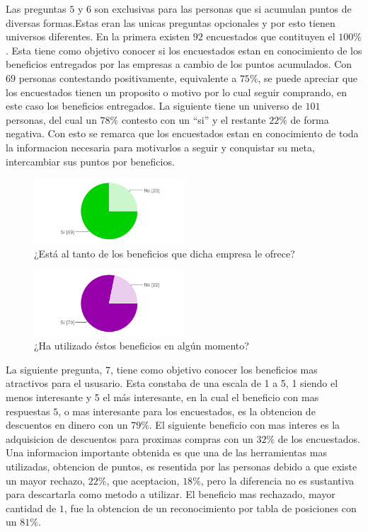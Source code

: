 Las preguntas $5$ y $6$ son exclusivas para las personas que si acumulan puntos de diversas formas.Estas 
eran las unicas preguntas opcionales y por esto tienen universos diferentes. 
En la primera existen $92$ encuestados que contituyen el $100\%$. Esta tiene como objetivo conocer 
si los encuestados estan en conocimiento de los beneficios entregados por las empresas a cambio de
 los puntos acumulados. Con $69$ personas contestando positivamente, equivalente a $75\%$, se puede
apreciar que los encuestados tienen un proposito o motivo por lo cual seguir comprando, en este caso
los beneficios entregados.
La siguiente tiene un universo de $101$ personas, del cual un $78\%$ contesto con un ``si'' y el 
restante $22\%$ de forma negativa. Con esto se remarca que los encuestados estan en conocimiento
de toda la informacion necesaria para motivarlos a seguir y conquistar su meta, intercambiar sus 
puntos por beneficios.

\begin{figure}[!htb]
  \centering
  \includegraphics[width=0.5\textwidth]{images/chartPreg5.png}
  \caption[chart5]{¿Está al tanto de los beneficios que dicha empresa le ofrece?}
  \label{fig:chart2}
\end{figure}

   
\begin{figure}[!htb]
  \centering
  \includegraphics[width=0.5\textwidth]{images/chartPreg6.png}
  \caption[chart6]{¿Ha utilizado éstos beneficios en algún momento?}
  \label{fig:chart2}
\end{figure}

La siguiente pregunta, $7$, tiene como objetivo conocer los beneficios mas atractivos para el ususario. 
Esta constaba de una escala de 1 a 5, 1 siendo el menos interesante y 5 el más interesante, en la cual
el beneficio con mas respuestas $5$, o mas interesante para los encuestados, es la obtencion de 
descuentos en dinero con un $79\%$. El siguiente beneficio con mas interes es la adquisicion de descuentos 
para proximas compras con un $32\%$ de los encuestados. Una informacion importante obtenida es que 
una de las herramientas mas utilizadas, obtencion de puntos, es resentida por las personas debido a 
que existe un mayor rechazo, $22\%$, que aceptacion, $18\%$, pero la diferencia no es sustantiva para 
descartarla como metodo a utilizar. El beneficio mas rechazado, mayor cantidad de $1$, fue la 
obtencion de un reconocimiento por tabla de posiciones con un $81\%$.

